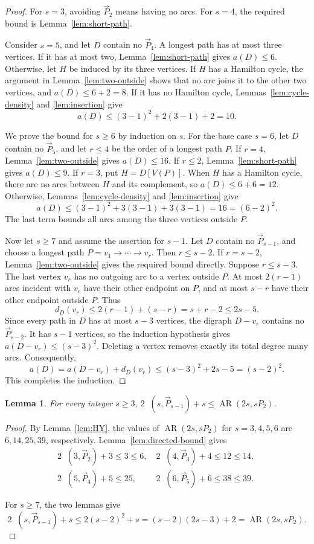 \documentclass[10pt,a4paper]{article}
\newtheorem{lemma}[theorem]{Lemma}
\DeclareMathOperator{\AR}{AR}
\DeclareMathOperator{\exdir}{ex_{dir}}
\newcommand{\dP}{\overrightarrow{P}}
\begin{document}
\begin{proof}
For $s=3$, avoiding $\dP_2$ means having no arcs. For $s=4$, the required
bound is Lemma~\ref{lem:short-path}.

Consider $s=5$, and let $D$ contain no $\dP_4$. A longest path has at most
three vertices. If it has at most two, Lemma~\ref{lem:short-path} gives
$a(D)\le6$. Otherwise, let $H$ be induced by its three vertices. If $H$
has a Hamilton cycle, the argument in Lemma~\ref{lem:two-outside} shows
that no arc joins it to the other two vertices, and $a(D)\le6+2=8$.
If it has no Hamilton cycle, Lemmas~\ref{lem:cycle-density} and
\ref{lem:insertion} give
\[
 a(D)\le(3-1)^2+2(3-1)+2=10.
\]

We prove the bound for $s\ge6$ by induction on $s$.
For the base case $s=6$, let $D$ contain no $\dP_5$, and let $r\le4$ be
the order of a longest path $P$. If $r=4$, Lemma~\ref{lem:two-outside}
gives $a(D)\le16$. If $r\le2$, Lemma~\ref{lem:short-path} gives
$a(D)\le9$. If $r=3$, put $H=D[V(P)]$. When $H$ has a Hamilton cycle,
there are no arcs between $H$ and its complement, so $a(D)\le6+6=12$.
Otherwise, Lemmas~\ref{lem:cycle-density} and \ref{lem:insertion} give
\[
 a(D)\le(3-1)^2+3(3-1)+3(3-1)=16=(6-2)^2.
\]
The last term bounds all arcs among the three vertices outside $P$.

Now let $s\ge7$ and assume the assertion for $s-1$. Let $D$ contain no
$\dP_{s-1}$, and choose a longest path $P=v_1\to\cdots\to v_r$.
Then $r\le s-2$. If $r=s-2$, Lemma~\ref{lem:two-outside} gives the
required bound directly. Suppose $r\le s-3$. The last vertex $v_r$ has
no outgoing arc to a vertex outside $P$. At most $2(r-1)$ arcs incident
with $v_r$ have their other endpoint on $P$, and at most $s-r$ have their
other endpoint outside $P$. Thus
\[
 d_D(v_r)\le2(r-1)+(s-r)=s+r-2\le2s-5.
\]
Since every path in $D$ has at most $s-3$ vertices, the digraph $D-v_r$
contains no $\dP_{s-2}$. It has $s-1$ vertices, so the induction hypothesis
gives $a(D-v_r)\le(s-3)^2$. Deleting a vertex removes exactly its total
degree many arcs. Consequently,
\[
 a(D)=a(D-v_r)+d_D(v_r)
 \le(s-3)^2+2s-5=(s-2)^2.
\]
This completes the induction.
\end{proof}
\begin{lemma}\label{lem:comparison}
For every integer $s\ge3$, $2\exdir(s,\dP_{s-1})+s\le \AR(2s,sP_2)$.
\end{lemma}
\begin{proof}
By Lemma~\ref{lem:HY}, the values of $\AR(2s,sP_2)$ for $s=3,4,5,6$ are
$6,14,25,39$, respectively. Lemma~\ref{lem:directed-bound} gives
\begin{align*}
& 2\exdir(3,\dP_{2})+3\le3\le6,\quad
2\exdir(4,\dP_{3})+4\le12\le14,\quad\\
&2\exdir(5,\dP_{4})+5\le25,\quad\quad\,\,
2\exdir(6,\dP_{5})+6\le38\le39.	
\end{align*}

For $s\ge7$, the two lemmas give
\[
 2\exdir(s,\dP_{s-1})+s\le2(s-2)^2+s
 =(s-2)(2s-3)+2=\AR(2s,sP_2).
\]
\end{proof}
\end{document}
